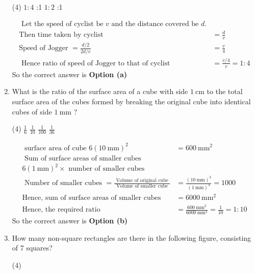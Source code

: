 \begin{enumerate}
 \begin{tasks}(4)
	\task[\textbf{a.}] $1: 4$
	:1
	\task[\textbf{c.}] $1: 2$
	:1
\end{tasks}
\begin{answer}
	\begin{align*}
	\text{ Let the speed of cyclist be $v$ and the distance covered be $d$.}\\
	\text{Then time taken by cyclist }&=\frac{d}{v}\\
	\text{Speed of Jogger }=\frac{d / 2}{2 d / v}&=\frac{v}{4}\\
\text{	Hence ratio of speed of Jogger to that of cyclist }&=\frac{v / 4}{v}=1: 4
	\end{align*}
		So the correct answer is \textbf{Option (a)}
\end{answer}
\item  What is the ratio of the surface area of a cube with side $1 \mathrm{~cm}$ to the total surface area of the cubes formed by breaking the original cube into identical cubes of side $1 \mathrm{~mm}$ ?
 \begin{tasks}(4)
	\task[\textbf{a.}]$\frac{1}{6}$
	\task[\textbf{b.}]$\frac{1}{10}$
	\task[\textbf{c.}]$\frac{1}{100}$
	\task[\textbf{d.}]$\frac{1}{36}$ 
\end{tasks}	
\begin{answer}
	\begin{align*}
\text{	surface area of cube $6(10 \mathrm{~mm})^{2}$}&=600 \mathrm{~mm}^{2}\\
\text{	Sum of surface areas of smaller cubes }&\\
\text{$6(1 \mathrm{~mm})^{2} \times$ number of smaller cubes}&\\
\text { Number of smaller cubes }=\frac{\text { Volume of original cube }}{\text { Volume of smaller cube }}&=\frac{(10 \mathrm{~mm})^{3}}{(1 \mathrm{~mm})^{3}}=1000\\
\text{Hence, sum of surface areas of smaller cubes }&=6000 \mathrm{~mm}^{2}\\
\text{Hence, the required ratio }&=\frac{600 \mathrm{~mm}^{2}}{6000 \mathrm{~mm}^{2}}=\frac{1}{10}=1: 10
	\end{align*}
		So the correct answer is \textbf{Option (b)}
\end{answer}
\item 	 How many non-square rectangles are there in the following figure, consisting of 7 squares?
 \begin{tasks}(4)

\end{tasks}
\end{enumerate}
